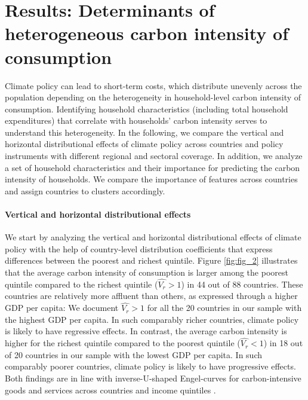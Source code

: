 \documentclass[12pt, a4paper]{article}
\begin{document}
\section{Results: Determinants of heterogeneous carbon intensity of consumption} \label{sec:results}

Climate policy can lead to short-term costs, which distribute unevenly across the population depending on the heterogeneity in household-level carbon intensity of consumption. Identifying household characteristics (including total household expenditures) that correlate with households' carbon intensity serves to understand this heterogeneity. In the following, we compare the vertical and horizontal distributional effects of climate policy across countries and policy instruments with different regional and sectoral coverage. In addition, we analyze a set of household characteristics and their importance for predicting the carbon intensity of households. We compare the importance of features across countries and assign countries to clusters accordingly.

\paragraph{Vertical and horizontal distributional effects}

We start by analyzing the vertical and horizontal distributional effects of climate policy with the help of country-level distribution coefficients that express differences between the poorest and richest quintile. Figure \ref{fig:fig_2} illustrates that the average carbon intensity of consumption is larger among the poorest quintile compared to the richest quintile ($\widehat{V_{r}}>1$) in 44 out of 88 countries. These countries are relatively more affluent than others, as expressed through a higher GDP per capita: We document $\widehat{V_{r}}>1$ for all the 20 countries in our sample with the highest GDP per capita. In such comparably richer countries, climate policy is likely to have regressive effects. In contrast, the average carbon intensity is higher for the richest quintile compared to the poorest quintile ($\widehat{V_{r}}<1$) in 18 out of 20 countries in our sample with the lowest GDP per capita. In such comparably poorer countries, climate policy is likely to have progressive effects. Both findings are in line with inverse-U-shaped Engel-curves for carbon-intensive goods and services across countries and income quintiles \autocite{Dorband.2019}. 
\end{document}
